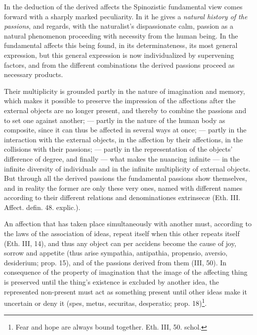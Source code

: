 \documentclass[12pt,a4paper,openany]{book}
\newcommand{\opage}[1]{\marginnote{\footnotesize\textit{[#1]}}}
\begin{document}
In the deduction of the derived affects the
Spinozistic fundamental view comes forward with a sharply marked peculiarity.
In it he gives a \emph{natural history of the
passions}, and regards, with the naturalist's dispassionate
calm, passion as a natural phenomenon proceeding with necessity
from the human being. In the fundamental affects
this being found, in its determinateness, its most general
expression, but this general expression is now individualized
by supervening factors, and from the different
combinations the derived passions proceed as necessary
products.

Their multiplicity is grounded partly in the nature of imagination
and memory, which makes it possible to preserve
the impression of the affections after the external objects
are no longer present, and thereby to combine the passions
and to set one against another; --- partly in
the nature of the human body as composite, since it
can thus be affected in several ways at once; --- partly
in the interaction with the external objects, in the affection
by their affections, in the collisions with their passions;
--- partly in the representation of the objects' difference of degree,
and finally --- what makes the nuancing infinite
--- in the infinite diversity of individuals and in the infinite
multiplicity of external objects. But through all
the derived passions the fundamental passions show themselves, and in
reality the former are only these very ones, named with different
names according to their different relations and denominationes
extrinsecæ (Eth. III. Affect. defin. 48. explic.).

An affection that has taken place simultaneously with
another must, according to the laws of the association of ideas, repeat itself
when this other repeats itself (Eth. III, 14), and thus
any object can per accidens become the cause of joy,
sorrow and appetite (thus arise sympathia, antipathia, propensio,
aversio, desiderium; prop. 15), and of the passions derived from them
(III, 50). In consequence of the property of
\opage{116}\setcounter{footnote}{0}imagination that the image of the affecting thing is preserved until
the thing's existence is excluded by another idea, the
represented non-present must act as something present until
other ideas make it uncertain or deny it (spes,
metus, securitas, desperatio; prop.
18)\footnote{Fear and hope are always bound together.
Eth. III, 50. schol.}.
\end{document}
